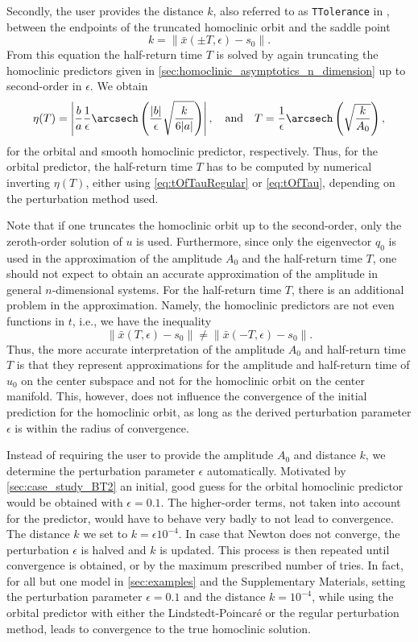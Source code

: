 Secondly, the user provides the distance $k$, also referred to as
\texttt{TTolerance} in \MATCONT, between the endpoints of the
truncated homoclinic orbit and the saddle point
\begin{equation}
    k = \|\bar x(\pm T,\epsilon)-s_0\|. \label{eq:TTolerance}
\end{equation}
From this equation the half-return time $T$ is solved by again truncating the
homoclinic predictors given in \cref{sec:homoclinic_asymptotics_n_dimension} up
to second-order in $\epsilon$. We obtain
\[
     \eta(T) = \left|\frac{b}{a} \frac{1}{\epsilon}
     \arcsech\left(\frac{|b|}{\epsilon} \sqrt{\frac{k}{6|a|}}\right)\right|,
     \quad \mbox{and} \quad 
     T  = \frac{1}{\epsilon} \arcsech\left(\sqrt{\frac{k}{A_0}}\right),
\] 
for the orbital and smooth homoclinic predictor, respectively. Thus, for the
orbital predictor, the half-return time $T$ has to be computed by numerical
inverting $\eta(T)$, either using \cref{eq:tOfTauRegular} or \cref{eq:tOfTau},
depending on the perturbation method used.

Note that if one truncates the homoclinic orbit up to the second-order, only
the zeroth-order solution of $u$ is used. Furthermore, since only the
eigenvector $q_0$ is used in the approximation of the amplitude $A_0$ and the
half-return time $T$, one should not expect to obtain an accurate approximation
of the amplitude in general $n$-dimensional systems. For the half-return time
$T$, there is an additional problem in the approximation. Namely, the homoclinic
predictors are not even functions in $t$, i.e., we have the inequality
\begin{equation*}
    \|\bar x(T,\epsilon)-s_0\| \neq \|\bar x(-T,\epsilon)-s_0\|.
\end{equation*}
Thus, the more accurate interpretation of the amplitude $A_0$ and half-return
time $T$ is that they represent approximations for the amplitude and
half-return time of $u_0$ on the center subspace and not for the homoclinic
orbit on the center manifold. This, however, does not influence the convergence
of the initial prediction for the homoclinic orbit, as long as the derived
perturbation parameter $\epsilon$ is within the radius of convergence.

Instead of requiring the user to provide the amplitude $A_0$ and distance $k$,
we determine the perturbation parameter $\epsilon$ automatically.  Motivated by
\cref{sec:case_study_BT2} an initial, good guess for the orbital homoclinic
predictor would be obtained with $\epsilon=0.1$. The higher-order terms, not
taken into account for the predictor, would have to behave very badly to not
lead to convergence. The distance $k$ we set to $k = \epsilon 10^{-4}$.  In
case that Newton does not converge, the perturbation $\epsilon$ is halved and
$k$ is updated.  This process is then repeated until convergence is obtained,
or by the maximum prescribed number of tries. In fact, for all but one model in
\cref{sec:examples} and the Supplementary Materials, setting the perturbation
parameter $\epsilon=0.1$ and the distance $k=10^{-4}$, while using the orbital
predictor with either the Lindstedt-Poincar\'e or the regular perturbation
method, leads to convergence to the true homoclinic solution.

